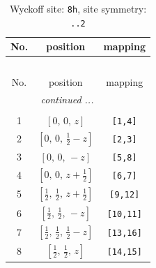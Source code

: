 \documentclass[fleqn,8pt]{jsarticle}
\begin{document}
\begin{longtable}{ccc}
\caption{Wyckoff site: {\tt 8h}, site symmetry: {\tt ..2}}
 \\
 \hline \hline
No. & position & mapping \\ \hline \endfirsthead

\multicolumn{2}{l}{\tablename\ \thetable{}} \\
 \hline \hline
No. & position & mapping \\ \hline \endhead

 \hline \hline
\multicolumn{2}{r}{\footnotesize\it continued ...} \\ \endfoot

 \hline \hline
\multicolumn{2}{r}{} \\ \endlastfoot

1 & $\left[ 0,\, 0,\, z \right]$ & {\tt [1,4]} \\ \hline
2 & $\left[ 0,\, 0,\, \frac{1}{2} - z \right]$ & {\tt [2,3]} \\ \hline
3 & $\left[ 0,\, 0,\, - z \right]$ & {\tt [5,8]} \\ \hline
4 & $\left[ 0,\, 0,\, z + \frac{1}{2} \right]$ & {\tt [6,7]} \\ \hline
5 & $\left[ \frac{1}{2},\, \frac{1}{2},\, z + \frac{1}{2} \right]$ & {\tt [9,12]} \\ \hline
6 & $\left[ \frac{1}{2},\, \frac{1}{2},\, - z \right]$ & {\tt [10,11]} \\ \hline
7 & $\left[ \frac{1}{2},\, \frac{1}{2},\, \frac{1}{2} - z \right]$ & {\tt [13,16]} \\ \hline
8 & $\left[ \frac{1}{2},\, \frac{1}{2},\, z \right]$ & {\tt [14,15]} \\
\end{longtable}
\renewcommand{\arraystretch}{1.2}
\end{document}
